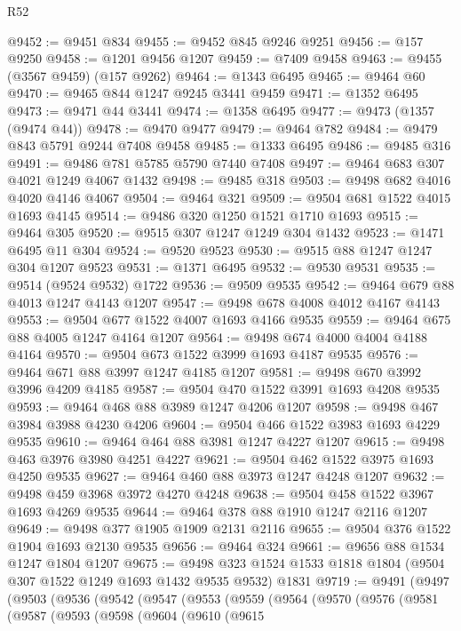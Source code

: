 \begin{lexlean}{R52}
\begin{coremodule}
@9452 := @9451 @834
@9455 := @9452 @845 @9246 @9251
@9456 := @157 @9250
@9458 := @1201 @9456 @1207
@9459 := @7409 @9458
@9463 := @9455 (@3567 @9459) (@157 @9262)
@9464 := @1343 @6495
@9465 := @9464 @60
@9470 := @9465 @844 @1247 @9245 @3441 @9459
@9471 := @1352 @6495
@9473 := @9471 @44 @3441
@9474 := @1358 @6495
@9477 := @9473 (@1357 (@9474 @44))
@9478 := @9470 @9477
@9479 := @9464 @782
@9484 := @9479 @843 @5791 @9244 @7408 @9458
@9485 := @1333 @6495
@9486 := @9485 @316
@9491 := @9486 @781 @5785 @5790 @7440 @7408
@9497 := @9464 @683 @307 @4021 @1249 @4067 @1432
@9498 := @9485 @318
@9503 := @9498 @682 @4016 @4020 @4146 @4067
@9504 := @9464 @321
@9509 := @9504 @681 @1522 @4015 @1693 @4145
@9514 := @9486 @320 @1250 @1521 @1710 @1693
@9515 := @9464 @305
@9520 := @9515 @307 @1247 @1249 @304 @1432
@9523 := @1471 @6495 @11 @304
@9524 := @9520 @9523
@9530 := @9515 @88 @1247 @1247 @304 @1207 @9523
@9531 := @1371 @6495
@9532 := @9530 @9531
@9535 := @9514 (@9524 @9532) @1722
@9536 := @9509 @9535
@9542 := @9464 @679 @88 @4013 @1247 @4143 @1207
@9547 := @9498 @678 @4008 @4012 @4167 @4143
@9553 := @9504 @677 @1522 @4007 @1693 @4166 @9535
@9559 := @9464 @675 @88 @4005 @1247 @4164 @1207
@9564 := @9498 @674 @4000 @4004 @4188 @4164
@9570 := @9504 @673 @1522 @3999 @1693 @4187 @9535
@9576 := @9464 @671 @88 @3997 @1247 @4185 @1207
@9581 := @9498 @670 @3992 @3996 @4209 @4185
@9587 := @9504 @470 @1522 @3991 @1693 @4208 @9535
@9593 := @9464 @468 @88 @3989 @1247 @4206 @1207
@9598 := @9498 @467 @3984 @3988 @4230 @4206
@9604 := @9504 @466 @1522 @3983 @1693 @4229 @9535
@9610 := @9464 @464 @88 @3981 @1247 @4227 @1207
@9615 := @9498 @463 @3976 @3980 @4251 @4227
@9621 := @9504 @462 @1522 @3975 @1693 @4250 @9535
@9627 := @9464 @460 @88 @3973 @1247 @4248 @1207
@9632 := @9498 @459 @3968 @3972 @4270 @4248
@9638 := @9504 @458 @1522 @3967 @1693 @4269 @9535
@9644 := @9464 @378 @88 @1910 @1247 @2116 @1207
@9649 := @9498 @377 @1905 @1909 @2131 @2116
@9655 := @9504 @376 @1522 @1904 @1693 @2130 @9535
@9656 := @9464 @324
@9661 := @9656 @88 @1534 @1247 @1804 @1207
@9675 := @9498 @323 @1524 @1533 @1818 @1804 (@9504 @307 @1522 @1249 @1693 @1432 @9535 @9532) @1831
@9719 := @9491
    (@9497
      (@9503
        (@9536
          (@9542
            (@9547
              (@9553
                (@9559
                  (@9564
                    (@9570
                      (@9576
                        (@9581
                          (@9587
                            (@9593
                              (@9598
                                (@9604
                                  (@9610
                                    (@9615

\end{coremodule}
\end{lexlean}
